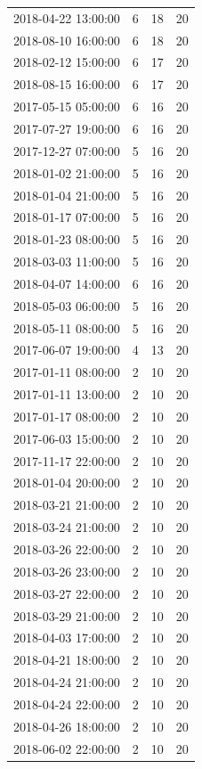 \begin{tabular}{lrrr}
2018-04-22 13:00:00 & 6 & 18 & 20 \\
2018-08-10 16:00:00 & 6 & 18 & 20 \\
2018-02-12 15:00:00 & 6 & 17 & 20 \\
2018-08-15 16:00:00 & 6 & 17 & 20 \\
2017-05-15 05:00:00 & 6 & 16 & 20 \\
2017-07-27 19:00:00 & 6 & 16 & 20 \\
2017-12-27 07:00:00 & 5 & 16 & 20 \\
2018-01-02 21:00:00 & 5 & 16 & 20 \\
2018-01-04 21:00:00 & 5 & 16 & 20 \\
2018-01-17 07:00:00 & 5 & 16 & 20 \\
2018-01-23 08:00:00 & 5 & 16 & 20 \\
2018-03-03 11:00:00 & 5 & 16 & 20 \\
2018-04-07 14:00:00 & 6 & 16 & 20 \\
2018-05-03 06:00:00 & 5 & 16 & 20 \\
2018-05-11 08:00:00 & 5 & 16 & 20 \\
2017-06-07 19:00:00 & 4 & 13 & 20 \\
2017-01-11 08:00:00 & 2 & 10 & 20 \\
2017-01-11 13:00:00 & 2 & 10 & 20 \\
2017-01-17 08:00:00 & 2 & 10 & 20 \\
2017-06-03 15:00:00 & 2 & 10 & 20 \\
2017-11-17 22:00:00 & 2 & 10 & 20 \\
2018-01-04 20:00:00 & 2 & 10 & 20 \\
2018-03-21 21:00:00 & 2 & 10 & 20 \\
2018-03-24 21:00:00 & 2 & 10 & 20 \\
2018-03-26 22:00:00 & 2 & 10 & 20 \\
2018-03-26 23:00:00 & 2 & 10 & 20 \\
2018-03-27 22:00:00 & 2 & 10 & 20 \\
2018-03-29 21:00:00 & 2 & 10 & 20 \\
2018-04-03 17:00:00 & 2 & 10 & 20 \\
2018-04-21 18:00:00 & 2 & 10 & 20 \\
2018-04-24 21:00:00 & 2 & 10 & 20 \\
2018-04-24 22:00:00 & 2 & 10 & 20 \\
2018-04-26 18:00:00 & 2 & 10 & 20 \\
2018-06-02 22:00:00 & 2 & 10 & 20 \\

\end{tabular}
